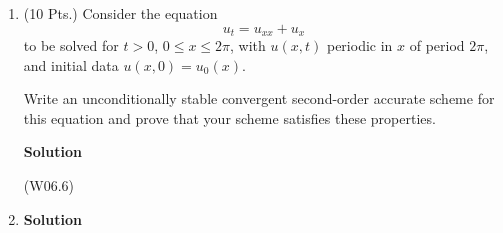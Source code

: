 \documentclass{article}
\begin{document}
\begin{enumerate}
\begin{enumerate}
\end{enumerate}



\item (10 Pts.) Consider the equation
\[u_t = u_{xx} + u_x\]
to be solved for \(t > 0\), \(0 \leq x \leq 2\pi\), with \(u(x,t)\) periodic in \(x\) of period \(2\pi\), and initial data \(u(x,0) = u_0(x)\).

Write an unconditionally stable convergent second-order accurate scheme for this equation and prove that your scheme satisfies these properties.

{\bf Solution}

(W06.6)



\item

{\bf Solution}



\end{enumerate}
\end{document}

